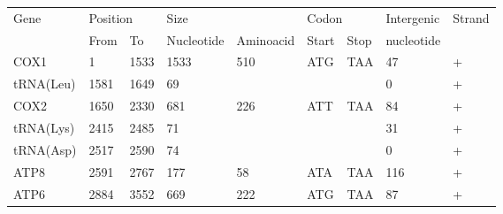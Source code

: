 \documentclass[../DISSERTACAO_MAIN.tex]{subfiles}
\begin{document}
\begin{longtable}{llllllllllllllllllllll}
			Gene         & \multicolumn{3}{l}{Position}               & \multicolumn{5}{l}{Size}                                                       & \multicolumn{6}{l}{Codon}                                     & \multicolumn{3}{l}{Intergenic}  & \multicolumn{4}{l}{Strand}             \\
			& From           & \multicolumn{2}{l}{To}    & \multicolumn{2}{l}{Nucleotide} & \multicolumn{3}{l}{Aminoacid}                 & \multicolumn{3}{l}{Start}         & \multicolumn{3}{l}{Stop}  & \multicolumn{3}{l}{nucleotide}  & \multicolumn{4}{l}{}                   \\
			COX1         & 1              & \multicolumn{2}{l}{1533}  & \multicolumn{2}{l}{1533}       & \multicolumn{3}{l}{510}                       & \multicolumn{3}{l}{ATG}           & \multicolumn{3}{l}{TAA}   & \multicolumn{3}{l}{47}          & \multicolumn{4}{l}{+}                  \\
			tRNA(Leu)    & 1581           & \multicolumn{2}{l}{1649}  & \multicolumn{2}{l}{69}         & \multicolumn{3}{l}{}                          & \multicolumn{3}{l}{}              & \multicolumn{3}{l}{}      & \multicolumn{3}{l}{0}           & \multicolumn{4}{l}{+}                  \\
			COX2         & 1650           & \multicolumn{2}{l}{2330}  & \multicolumn{2}{l}{681}        & \multicolumn{3}{l}{226}                       & \multicolumn{3}{l}{ATT}           & \multicolumn{3}{l}{TAA}   & \multicolumn{3}{l}{84}          & \multicolumn{4}{l}{+}                  \\
			tRNA(Lys)    & 2415           & \multicolumn{2}{l}{2485}  & \multicolumn{2}{l}{71}         & \multicolumn{3}{l}{}                          & \multicolumn{3}{l}{}              & \multicolumn{3}{l}{}      & \multicolumn{3}{l}{31}          & \multicolumn{4}{l}{+}                  \\
			tRNA(Asp)    & 2517           & \multicolumn{2}{l}{2590}  & \multicolumn{2}{l}{74}         & \multicolumn{3}{l}{}                          & \multicolumn{3}{l}{}              & \multicolumn{3}{l}{}      & \multicolumn{3}{l}{0}           & \multicolumn{4}{l}{+}                  \\
			ATP8         & 2591           & \multicolumn{2}{l}{2767}  & \multicolumn{2}{l}{177}        & \multicolumn{3}{l}{58}                        & \multicolumn{3}{l}{ATA}           & \multicolumn{3}{l}{TAA}   & \multicolumn{3}{l}{116}         & \multicolumn{4}{l}{+}                  \\
			ATP6         & 2884           & \multicolumn{2}{l}{3552}  & \multicolumn{2}{l}{669}        & \multicolumn{3}{l}{222}                       & \multicolumn{3}{l}{ATG}           & \multicolumn{3}{l}{TAA}   & \multicolumn{3}{l}{87}          & \multicolumn{4}{l}{+}                  \\

\end{longtable}
\end{document}
